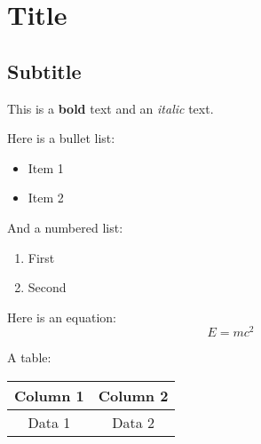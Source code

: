 \section{Title}

\subsection{Subtitle}

This is a \textbf{bold} text and an \textit{italic} text.

Here is a bullet list:
\begin{itemize}
  \item Item 1
  \item Item 2
\end{itemize}

And a numbered list:
\begin{enumerate}
  \item First
  \item Second
\end{enumerate}

Here is an equation:
\[
E = mc^2
\]

A table:

\begin{tabular}{|c|c|}
\hline
Column 1 & Column 2 \\
\hline
Data 1   & Data 2   \\
\hline
\end{tabular}
